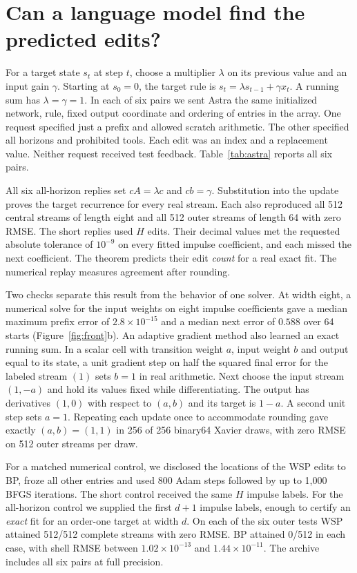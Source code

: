 \section{Can a language model find the predicted edits?}\label{sec:writer}
For a target state $s_t$ at step $t$, choose a multiplier $\lambda$ on its previous value and an input gain $\gamma$. Starting at $s_0=0$, the target rule is $s_t=\lambda s_{t-1}+\gamma x_t$. A running sum has $\lambda=\gamma=1$. In each of six pairs we sent Astra the same initialized network, rule, fixed output coordinate and ordering of entries in the array. One request specified just a prefix and allowed scratch arithmetic. The other specified all horizons and prohibited tools. Each edit was an index and a replacement value. Neither request received test feedback. Table~\ref{tab:astra} reports all six pairs.


All six all-horizon replies set $cA=\lambda c$ and $cb=\gamma$. Substitution into the update proves the target recurrence for every real stream. Each also reproduced all 512 central streams of length eight and all 512 outer streams of length 64 with zero RMSE. The short replies used $H$ edits. Their decimal values met the requested absolute tolerance of $10^{-9}$ on every fitted impulse coefficient, and each missed the next coefficient. The theorem predicts their edit \emph{count} for a real exact fit. The numerical replay measures agreement after rounding.

Two checks separate this result from the behavior of one solver. At width eight, a numerical solve for the input weights on eight impulse coefficients gave a median maximum prefix error of $2.8\times10^{-15}$ and a median next error of $0.588$ over 64 starts (Figure~\ref{fig:front}b). An adaptive gradient method also learned an exact running sum. In a scalar cell with transition weight $a$, input weight $b$ and output equal to its state, a unit gradient step on half the squared final error for the labeled stream $(1)$ sets $b=1$ in real arithmetic. Next choose the input stream $(1,-a)$ and hold its values fixed while differentiating. The output has derivatives $(1,0)$ with respect to $(a,b)$ and its target is $1-a$. A second unit step sets $a=1$. Repeating each update once to accommodate rounding gave exactly $(a,b)=(1,1)$ in 256 of 256 binary64 Xavier draws, with zero RMSE on 512 outer streams per draw.

For a matched numerical control, we disclosed the locations of the WSP edits to BP, froze all other entries and used 800 Adam steps followed by up to 1,000 BFGS iterations. The short control received the same $H$ impulse labels. For the all-horizon control we supplied the first $d+1$ impulse labels, enough to certify an \emph{exact} fit for an order-one target at width $d$. On each of the six outer tests WSP attained 512/512 complete streams with zero RMSE. BP attained 0/512 in each case, with shell RMSE between $1.02\times10^{-13}$ and $1.44\times10^{-11}$. The archive includes all six pairs at full precision.
